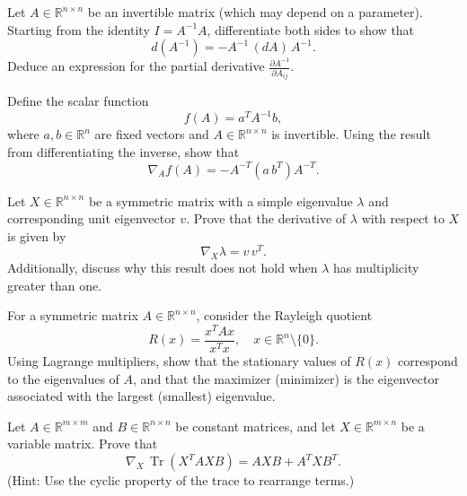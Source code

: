 \begin{exercise}
   Let $A \in \mathbb{R}^{n\times n}$ be an invertible matrix (which may depend on a parameter). Starting from the identity $I = A^{-1}A$, differentiate both sides to show that
   \[
      d(A^{-1}) = -A^{-1}\,(dA)\,A^{-1}.
   \]
   Deduce an expression for the partial derivative $\frac{\partial A^{-1}}{\partial A_{ij}}$.
\end{exercise}

\begin{exercise}
   Define the scalar function
   \[
      f(A)=a^T A^{-1} b,
   \]
   where $a,b\in\mathbb{R}^n$ are fixed vectors and $A\in\mathbb{R}^{n\times n}$ is invertible. Using the result from differentiating the inverse, show that
   \[
      \nabla_A f(A) = -A^{-T}(a\,b^T)A^{-T}.
   \]
\end{exercise}

\begin{exercise}
   Let $X\in\mathbb{R}^{n\times n}$ be a symmetric matrix with a simple eigenvalue $\lambda$ and corresponding unit eigenvector $v$. Prove that the derivative of $\lambda$ with respect to $X$ is given by
   \[
      \nabla_X \lambda = v\,v^T.
   \]
   Additionally, discuss why this result does not hold when $\lambda$ has multiplicity greater than one.
\end{exercise}

\begin{exercise}
   For a symmetric matrix $A\in\mathbb{R}^{n\times n}$, consider the Rayleigh quotient
   \[
      R(x) = \frac{x^T A x}{x^T x}, \quad x\in\mathbb{R}^n\setminus\{0\}.
   \]
   Using Lagrange multipliers, show that the stationary values of $R(x)$ correspond to the eigenvalues of $A$, and that the maximizer (minimizer) is the eigenvector associated with the largest (smallest) eigenvalue.
\end{exercise}
\begin{exercise}
   Let $A\in\mathbb{R}^{m\times m}$ and $B\in\mathbb{R}^{n\times n}$ be constant matrices, and let $X\in\mathbb{R}^{m\times n}$ be a variable matrix. Prove that
   \[
      \nabla_X\,\operatorname{Tr}(X^T A X B) = A X B + A^T X B^T.
   \]
   (Hint: Use the cyclic property of the trace to rearrange terms.)
\end{exercise}

